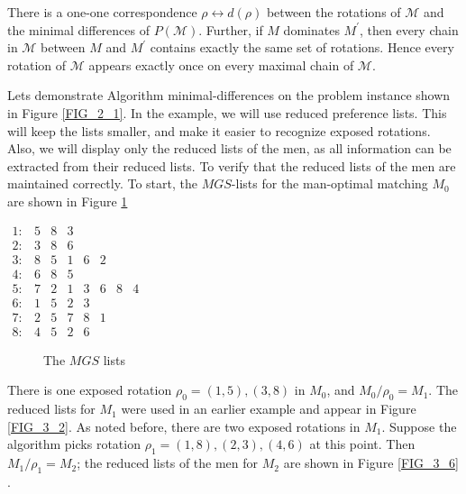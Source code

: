\begin{theorem}\label{thm_3_4}
    There is a one-one correspondence $\rho \leftrightarrow d(\rho)$ between the rotations of $\mathcal{M}$ and the minimal differences of $P(\mathcal{M})$. Further, if $M$ dominates $M^{\prime}$, then every chain in $\mathcal{M}$ between $M$ and $M^{\prime}$ contains exactly the same set of rotations. Hence every rotation of $\mathcal{M}$ appears exactly once on every maximal chain of $\mathcal{M}$.
\end{theorem}
    
\begin{exmp}\label{exmp_3_7}
    Lets demonstrate Algorithm minimal-differences on the problem instance shown in Figure \ref{FIG_2_1}. In the example, we will use reduced preference lists. This will keep the lists smaller, and make it easier to recognize exposed rotations. Also, we will display only the reduced lists of the men, as all information can be extracted from their reduced lists. To verify that the reduced lists of the men are maintained correctly. To start, the $MGS$-lists for the man-optimal matching $M_0$ are shown in Figure \ref{FIG_3_5} 
\end{exmp}

\begin{center}
    $\begin{array}{llllllll}1: & 5 & 8 & 3 & & & & \\ 2: & 3 & 8 & 6 & & & & \\ 3: & 8 & 5 & 1 & 6 & 2 & & \\ 4: & 6 & 8 & 5 & & & & \\ 5: & 7 & 2 & 1 & 3 & 6 & 8 & 4 \\ 6: & 1 & 5 & 2 & 3 & & & \\ 7: & 2 & 5 & 7 & 8 & 1 & & \\ 8: & 4 & 5 & 2 & 6 & & & \end{array}$
    \begin{figure}[h]
  \centering
  \caption{ The $MGS$ lists}
  \label{FIG_3_5}
\end{figure}
\end{center}

\begin{exmp}\label{exmp_3_8}
    There is one exposed rotation $\rho_0=(1,5),(3,8)$ in $M_0$, and $M_0 / \rho_0=M_1$. The reduced lists for $M_1$ were used in an earlier example and appear in Figure \ref{FIG_3_2}. As noted before, there are two exposed rotations in $M_1$. Suppose the algorithm picks rotation $\rho_1=(1,8),(2,3),(4,6)$ at this point. Then $M_1 / \rho_1=M_2$; the reduced lists of the men for $M_2$ are shown in Figure \ref{FIG_3_6} .
\end{exmp}


